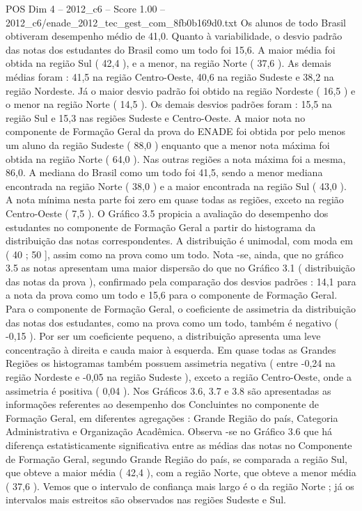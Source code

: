 \begin{textsample}{POS Dim 4 – 2012\_c6 – Score 1.00 – 2012\_c6/enade\_2012\_tec\_gest\_com\_8fb0b169d0.txt}
Os alunos de todo Brasil obtiveram desempenho médio de 41,0.
Quanto à variabilidade, o desvio padrão das notas dos estudantes do Brasil como um todo foi 15,6.
A maior média foi obtida na região Sul ( 42,4 ), e a menor, na região Norte ( 37,6 ).
As demais médias foram : 41,5 na região Centro-Oeste, 40,6 na região Sudeste e 38,2 na região Nordeste.
Já o maior desvio padrão foi obtido na região Nordeste ( 16,5 ) e o menor na região Norte ( 14,5 ).
Os demais desvios padrões foram : 15,5 na região Sul e 15,3 nas regiões Sudeste e Centro-Oeste.
A maior nota no componente de Formação Geral da prova do ENADE foi obtida por pelo menos um aluno da região Sudeste ( 88,0 ) enquanto que a menor nota máxima foi obtida na região Norte ( 64,0 ).
Nas outras regiões a nota máxima foi a mesma, 86,0.
A mediana do Brasil como um todo foi 41,5, sendo a menor mediana encontrada na região Norte ( 38,0 ) e a maior encontrada na região Sul ( 43,0 ).
A nota mínima nesta parte foi zero em quase todas as regiões, exceto na região Centro-Oeste ( 7,5 ).
O Gráfico 3.5 propicia a avaliação do desempenho dos estudantes no componente de Formação Geral a partir do histograma da distribuição das notas correspondentes.
A distribuição é unimodal, com moda em ( 40 ; 50 ], assim como na prova como um todo.
Nota -se, ainda, que no gráfico 3.5 as notas apresentam uma maior dispersão do que no Gráfico 3.1 ( distribuição das notas da prova ), confirmado pela comparação dos desvios padrões : 14,1 para a nota da prova como um todo e 15,6 para o componente de Formação Geral.
Para o componente de Formação Geral, o coeficiente de assimetria da distribuição das notas dos estudantes, como na prova como um todo, também é negativo ( -0,15 ).
Por ser um coeficiente pequeno, a distribuição apresenta uma leve concentração à direita e cauda maior à esquerda.
Em quase todas as Grandes Regiões os histogramas também possuem assimetria negativa ( entre -0,24 na região Nordeste e -0,05 na região Sudeste ), exceto a região Centro-Oeste, onde a assimetria é positiva ( 0,04 ).
Nos Gráficos 3.6, 3.7 e 3.8 são apresentadas as informações referentes ao desempenho dos Concluintes no componente de Formação Geral, em diferentes agregações : Grande Região do país, Categoria Administrativa e Organização Acadêmica.
Observa -se no Gráfico 3.6 que há diferença estatisticamente significativa entre as médias das notas no Componente de Formação Geral, segundo Grande Região do país, se comparada a região Sul, que obteve a maior média ( 42,4 ), com a região Norte, que obteve a menor média ( 37,6 ).
Vemos que o intervalo de confiança mais largo é o da região Norte ; já os intervalos mais estreitos são observados nas regiões Sudeste e Sul.

\end{textsample}
